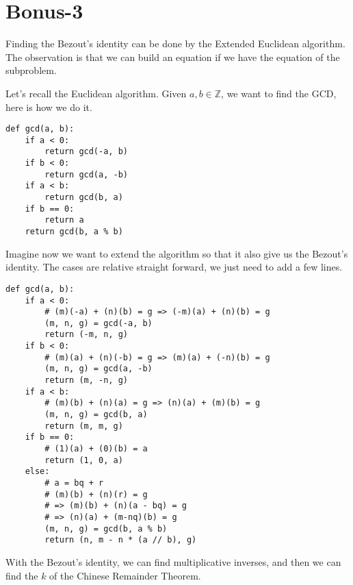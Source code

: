 \section*{Bonus-3}
Finding the Bezout's identity can be done by the Extended Euclidean algorithm. The observation is that we can build an equation if we have the equation of the subproblem.

Let's recall the Euclidean algorithm. Given $ a, b \in \mathbb{Z} $, we want to find the GCD, here is how we do it.

\begin{verbatim}
def gcd(a, b):
    if a < 0:
        return gcd(-a, b)
    if b < 0:
        return gcd(a, -b)
    if a < b:
        return gcd(b, a)
    if b == 0:
        return a
    return gcd(b, a % b)
\end{verbatim}

Imagine now we want to extend the algorithm so that it also give us the Bezout's identity. The cases are relative straight forward, we just need to add a few lines.

\begin{verbatim}
def gcd(a, b):
    if a < 0:
        # (m)(-a) + (n)(b) = g => (-m)(a) + (n)(b) = g
        (m, n, g) = gcd(-a, b)
        return (-m, n, g)
    if b < 0:
        # (m)(a) + (n)(-b) = g => (m)(a) + (-n)(b) = g
        (m, n, g) = gcd(a, -b)
        return (m, -n, g)
    if a < b:
        # (m)(b) + (n)(a) = g => (n)(a) + (m)(b) = g
        (m, n, g) = gcd(b, a)
        return (m, m, g)
    if b == 0:
        # (1)(a) + (0)(b) = a
        return (1, 0, a)
    else:
        # a = bq + r
        # (m)(b) + (n)(r) = g
        # => (m)(b) + (n)(a - bq) = g
        # => (n)(a) + (m-nq)(b) = g
        (m, n, g) = gcd(b, a % b)
        return (n, m - n * (a // b), g)
\end{verbatim}

With the Bezout's identity, we can find multiplicative inverses, and then we can find the $ k $ of the Chinese Remainder Theorem.